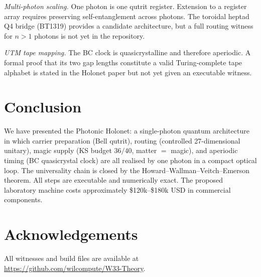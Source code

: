 \documentclass[prl,twocolumn,showpacs,superscriptaddress,longbibliography]{revtex4-2}
\begin{document}
\emph{Multi-photon scaling.}
One photon is one qutrit register.
Extension to a register array requires preserving self-entanglement
across photons. The toroidal heptad Q4 bridge (BT1319) provides
a candidate architecture, but a full routing witness for $n>1$
photons is not yet in the repository.

\emph{UTM tape mapping.}
The BC clock is quasicrystalline and therefore aperiodic.
A formal proof that its two gap lengths constitute a valid
Turing-complete tape alphabet is stated in the Holonet paper
but not yet given an executable witness.

\section{Conclusion}

We have presented the Photonic Holonet: a single-photon quantum
architecture in which carrier preparation (Bell qutrit),
routing (controlled 27-dimensional unitary), magic supply
(KS budget $36/40$, matter $=$ magic), and aperiodic timing
(BC quasicrystal clock) are all realised by one photon in a
compact optical loop. The universality chain is closed by the
Howard--Wallman--Veitch--Emerson theorem. All steps are
executable and numerically exact. The proposed laboratory
machine costs approximately \$120k--\$180k USD in commercial
components.

\section*{Acknowledgements}

All witnesses and build files are available at
\url{https://github.com/wilcompute/W33-Theory}.
\end{document}

